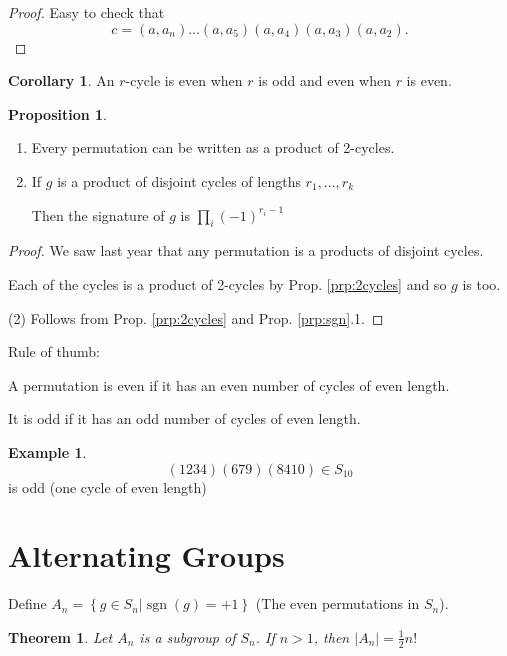 \documentclass{article}
\newtheorem{theorem}{Theorem}
\theoremstyle{definition}
\newtheorem{proposition}{Proposition}
\newtheorem*{corollary}{Corollary}
\newtheorem*{exmp}{Example}
\DeclareMathOperator{\sgn}{sgn}
\begin{document}
\begin{proof}
  Easy to check that
    $$c=(a,a_n)\ldots(a,a_5)(a,a_4)(a,a_3)(a,a_2).$$
\end{proof}

\begin{corollary}
  An $r$-cycle is even when $r$ is odd and even when $r$ is even.\\
\end{corollary}

\begin{proposition}\hfill
  \begin{enumerate}
    \item Every permutation can be written as a product of 2-cycles.
    \item If $g$ is a product of disjoint cycles of lengths $r_1, \ldots, r_k$

      Then the signature of $g$ is $\prod_{i} (-1)^{r_i - 1}$
  \end{enumerate}
\end{proposition}

\begin{proof}
  We saw last year that any permutation is a products of disjoint cycles.

  Each of the cycles is a product of 2-cycles by Prop. \ref{prp:2cycles} and so $g$ is too.

  (2) Follows from Prop. \ref{prp:2cycles} and Prop. \ref{prp:sgn}.1.
\end{proof}

Rule of thumb:

A permutation is even if it has an even number of cycles of even length.

It is odd if it has an odd number of cycles of even length.\\

\begin{exmp}
$$(1 2 3 4)(6 7 9)(8 4 10) \in S_{10}$$ is odd (one cycle of even length)
\end{exmp}


\section{Alternating Groups}

Define $A_n=\left\{ g \in S_n | \sgn(g) = +1 \right\}$ (The even permutations in $S_n$).\\

\begin{theorem}
  Let $A_n$ is a subgroup of $S_n$. If $n>1$, then $|A_n|=\frac{1}{2}n!$
  \label{thm:subgroup}
\end{theorem}
\end{document}
